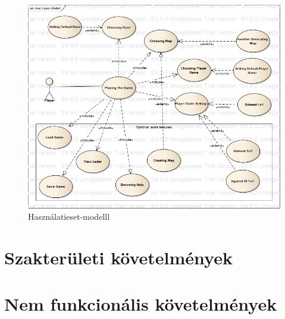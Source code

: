 \documentclass[a4paper,12pt]{report}
\begin{document}
\begin{figure}[hbtp]
\centering
\includegraphics[width=1\textwidth]{UseCaseModel.png}
\caption{Használatieset-modelll}
\label{fig:hmm}
\end{figure}

\section{Szakterületi követelmények}

\section{Nem funkcionális követelmények}
\end{document}
